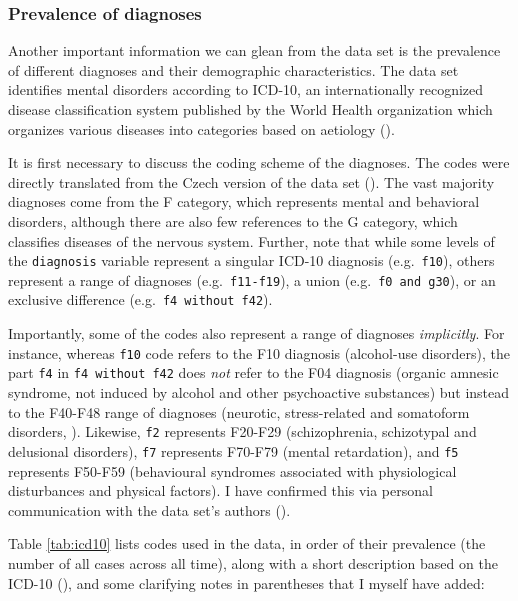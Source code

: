 \documentclass[
  openany]{book}
\theoremstyle{definition}
\theoremstyle{definition}
\theoremstyle{definition}
\theoremstyle{definition}
\theoremstyle{remark}
\begin{document}
\subsubsection{Prevalence of diagnoses}\label{prevalence-of-diagnoses}

Another important information we can glean from the data set is the prevalence of different diagnoses and their demographic characteristics. The data set identifies mental disorders according to ICD-10, an internationally recognized disease classification system published by the World Health organization which organizes various diseases into categories based on aetiology ().

It is first necessary to discuss the coding scheme of the diagnoses. The codes were directly translated from the Czech version of the data set (). The vast majority diagnoses come from the F category, which represents mental and behavioral disorders, although there are also few references to the G category, which classifies diseases of the nervous system. Further, note that while some levels of the \texttt{diagnosis} variable represent a singular ICD-10 diagnosis (e.g.~\texttt{f10}), others represent a range of diagnoses (e.g.~\texttt{f11-f19}), a union (e.g.~\texttt{f0\ and\ g30}), or an exclusive difference (e.g.~\texttt{f4\ without\ f42}).

Importantly, some of the codes also represent a range of diagnoses \emph{implicitly}. For instance, whereas \texttt{f10} code refers to the F10 diagnosis (alcohol-use disorders), the part \texttt{f4} in \texttt{f4\ without\ f42} does \emph{not} refer to the F04 diagnosis (organic amnesic syndrome, not induced by alcohol and other psychoactive substances) but instead to the F40-F48 range of diagnoses (neurotic, stress-related and somatoform disorders, ). Likewise, \texttt{f2} represents F20-F29 (schizophrenia, schizotypal and delusional disorders), \texttt{f7} represents F70-F79 (mental retardation), and \texttt{f5} represents F50-F59 (behavioural syndromes associated with physiological disturbances and physical factors). I have confirmed this via personal communication with the data set's authors ().

Table \ref{tab:icd10} lists codes used in the data, in order of their prevalence (the number of all cases across all time), along with a short description based on the ICD-10 (), and some clarifying notes in parentheses that I myself have added:
\end{document}
